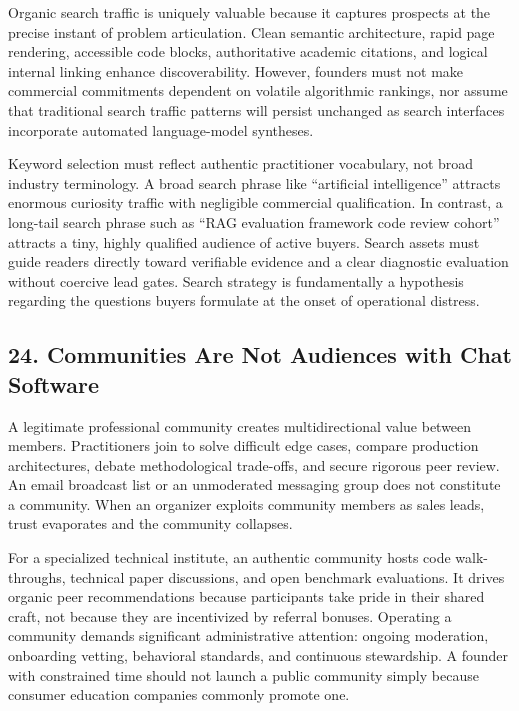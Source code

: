 Organic search traffic is uniquely valuable because it captures prospects at the precise instant of problem articulation. Clean semantic architecture, rapid page rendering, accessible code blocks, authoritative academic citations, and logical internal linking enhance discoverability. However, founders must not make commercial commitments dependent on volatile algorithmic rankings, nor assume that traditional search traffic patterns will persist unchanged as search interfaces incorporate automated language-model syntheses.

Keyword selection must reflect authentic practitioner vocabulary, not broad industry terminology. A broad search phrase like ``artificial intelligence'' attracts enormous curiosity traffic with negligible commercial qualification. In contrast, a long-tail search phrase such as ``RAG evaluation framework code review cohort'' attracts a tiny, highly qualified audience of active buyers. Search assets must guide readers directly toward verifiable evidence and a clear diagnostic evaluation without coercive lead gates. Search strategy is fundamentally a hypothesis regarding the questions buyers formulate at the onset of operational distress.

\subsection*{24. Communities Are Not Audiences with Chat Software}

A legitimate professional community creates multidirectional value between members. Practitioners join to solve difficult edge cases, compare production architectures, debate methodological trade-offs, and secure rigorous peer review. An email broadcast list or an unmoderated messaging group does not constitute a community. When an organizer exploits community members as sales leads, trust evaporates and the community collapses.

For a specialized technical institute, an authentic community hosts code walk-throughs, technical paper discussions, and open benchmark evaluations. It drives organic peer recommendations because participants take pride in their shared craft, not because they are incentivized by referral bonuses. Operating a community demands significant administrative attention: ongoing moderation, onboarding vetting, behavioral standards, and continuous stewardship. A founder with constrained time should not launch a public community simply because consumer education companies commonly promote one.

